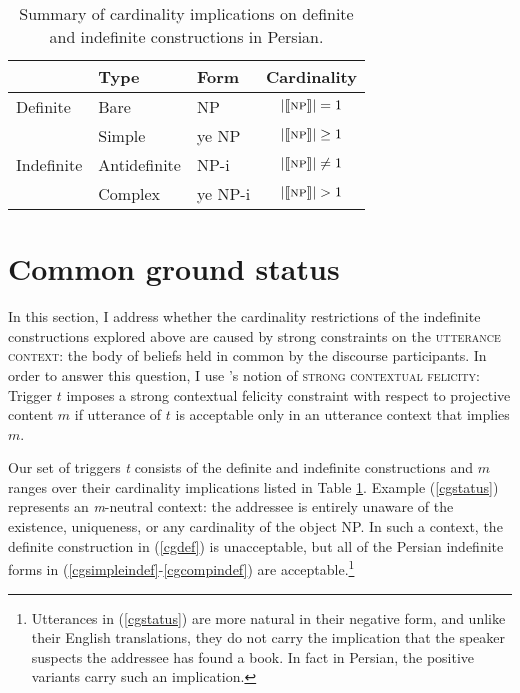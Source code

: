 \documentclass{salt}
\begin{document}
\begin {table}
\centering
\begin {tabular} {l | l | l | c}
 & Type & Form & Cardinality\\ \hline
Definite & Bare & \hspace{0.43cm} {\small NP} &  $| \llbracket \textsc{np} \rrbracket | = 1$ \\ \hdashline
& Simple & {\color {red}ye} {\small NP} & $| \llbracket \textsc{np} \rrbracket | \geq 1$\\
Indefinite & Antidefinite & \hspace{0.43cm} \small{NP}-{\color {blue}i} & $| \llbracket \textsc{np} \rrbracket | \not = 1$\\
& Complex & {\color {red}ye} {\small NP}-{\color {blue}i} & $| \llbracket \textsc{np} \rrbracket | > 1$\\
\end {tabular}
\caption {{\footnotesize Summary of cardinality implications on definite and indefinite constructions in Persian.}}
\label{cardinaltable}
\end {table}

\section{Common ground status} \label{cg}

In this section, I address whether the cardinality restrictions of the indefinite constructions explored above are caused by strong constraints on the \textsc{utterance context}: the body of beliefs held in common by the discourse participants. In order to answer this question, I use \cite{tonhauser2013toward}'s notion of \textsc{strong contextual felicity}: Trigger $t$ imposes a strong contextual felicity constraint with respect to projective content $m$ if utterance of $t$ is acceptable only in an utterance context that implies $m$.

Our set of triggers \emph{t} consists of the definite and indefinite constructions and $m$ ranges over their cardinality implications listed in Table \ref{cardinaltable}. Example (\ref{cgstatus}) represents an \emph{m}-neutral context: the addressee is entirely unaware of the existence, uniqueness, or any cardinality of the object NP. In such a context, the definite construction in (\ref{cgdef}) is unacceptable, but all of the Persian indefinite forms in (\ref{cgsimpleindef}-\ref{cgcompindef}) are acceptable.\footnote{Utterances in (\ref{cgstatus}) are more natural in their negative form, and unlike their English translations, they do not carry the implication that the speaker suspects the addressee has found a book. In fact in Persian, the positive variants carry such an implication.}
\end{document}

